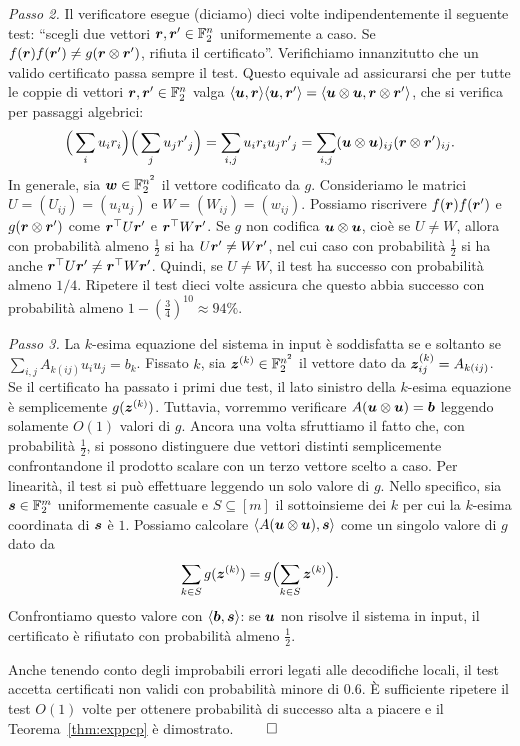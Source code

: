 \emph{Passo 2.}
Il verificatore esegue (diciamo) dieci volte indipendentemente il seguente test:
``scegli due vettori $\rr, \rr' \in \F_2^n$ uniformemente a caso. Se
$f(\rr)f(\rr') \neq g(\rr \otimes \rr')$, rifiuta il certificato''.
Verifichiamo innanzitutto che un valido certificato passa sempre il test.
Questo equivale ad assicurarsi che per tutte le coppie di
vettori $\rr, \rr' \in \F_2^n$ valga
$\langle \uu, \rr \rangle \langle \uu, \rr' \rangle =
\langle \uu \otimes \uu, \rr \otimes \rr' \rangle$, che si verifica per
passaggi algebrici:
\[
\Big( \sum_i u_i r_i \Big) \Big( \sum_j u_j {r'}_j \Big)
= \sum_{i, j} u_i r_i u_j {r'}_j
= \sum_{i, j} (\uu \otimes \uu)_{i j} (\rr \otimes \rr')_{i j}.
\]
In generale, sia $\ww \in \F_2^{n^2}$ il vettore codificato da $g$.
Consideriamo le matrici $U = (U_{i j}) = (u_i u_j)$ e $W = (W_{i j}) = (w_{i j})$.
Possiamo riscrivere $f(\rr)f(\rr')$ e $g(\rr \otimes \rr')$ come
$\rr^\top U \rr'$ e $\rr^\top W \rr'$.
Se $g$ non codifica $\uu \otimes \uu$, cioè se $U \neq W$, allora con
probabilità almeno $\frac12$ si ha $U \rr' \neq W \rr'$, nel cui caso con
probabilità $\frac12$ si ha anche $\rr^\top U \rr' \neq \rr^\top W \rr'$.
Quindi, se $U \neq W$, il test ha successo con probabilità almeno $1/4$.
Ripetere il test dieci volte assicura che questo abbia successo con
probabilità almeno $1 - (\frac34)^{10} \approx 94\%$.

\emph{Passo 3.}
La $k$-esima equazione del sistema in input è soddisfatta se e soltanto se
$\sum_{i, j}{A_{k (i j)} u_i u_j} = b_k$. Fissato $k$, sia
$\zz^{(k)} \in \F_2^{n^2}$ il vettore dato da $\zz^{(k)}_{i j} = A_{k (i j)}$.
Se il certificato ha passato i primi due test, il lato sinistro della $k$-esima
equazione è semplicemente $g(\zz^{(k)})$.
Tuttavia, vorremmo verificare $A(\uu \otimes \uu) = \bb$ leggendo solamente
$O(1)$ valori di $g$. Ancora una volta sfruttiamo il fatto che, con
probabilità $\frac12$, si possono distinguere due vettori distinti semplicemente
confrontandone il prodotto scalare con un terzo vettore scelto a caso.
Per linearità, il test si può effettuare leggendo un solo valore di $g$.
Nello specifico, sia $\ss \in \F_2^m$ uniformemente casuale e $S \subseteq [m]$
il sottoinsieme dei $k$ per cui la $k$-esima coordinata di $\ss$ è $1$.
Possiamo calcolare $\langle A(\uu \otimes \uu), \ss \rangle$ come un singolo
valore di $g$ dato da
\[
	\sum_{k \in S} g(\zz^{(k)}) = g\Bigl(\sum_{k \in S} \zz^{(k)}\Bigr).
\]
Confrontiamo questo valore con $\langle \bb, \ss \rangle$: se $\uu$ non risolve
il sistema in input, il certificato è rifiutato con probabilità almeno
$\frac12$.

Anche tenendo conto degli improbabili errori legati alle decodifiche locali,
il test accetta certificati non validi con probabilità minore di $0.6$.
È sufficiente ripetere il test $O(1)$ volte per ottenere probabilità di
successo alta a piacere e il Teorema~\ref{thm:exppcp} è dimostrato. \hfill $\qed$

